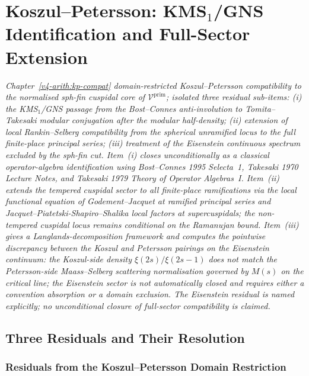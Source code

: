 \chapter{Koszul--Petersson: KMS\texorpdfstring{\({}_{1}\)}{1}/GNS Identification and Full-Sector Extension}
\label{v4-arith:kms-gns-full}

\emph{Chapter~\ref{v4-arith:kp-compat} domain-restricted
Koszul--Petersson compatibility to the normalised sph-fin cuspidal
core of \(\mathcal{V}^{\mathrm{prim}}\);
 isolated three residual
sub-items: (i) the KMS\({}_{1}\)/GNS passage from the Bost--Connes
anti-involution to Tomita--Takesaki modular conjugation after the
modular half-density; (ii)
extension of local Rankin--Selberg compatibility from the spherical
unramified locus to the full finite-place principal series; (iii)
treatment of the Eisenstein continuous spectrum excluded by the
sph-fin cut. Item~(i) closes unconditionally as a classical
operator-algebra identification using Bost--Connes 1995 Selecta~1,
Takesaki 1970 Lecture Notes, and Takesaki 1979 \emph{Theory of
Operator Algebras~I}. Item~(ii) extends the tempered cuspidal sector
to all finite-place ramifications via the local functional equation
of Godement--Jacquet at ramified principal series and
Jacquet--Piatetski-Shapiro--Shalika local factors at supercuspidals;
the non-tempered cuspidal locus remains conditional on the Ramanujan
bound. Item~(iii) gives a Langlands-decomposition framework and
computes the pointwise discrepancy between the Koszul and Petersson
pairings on the Eisenstein continuum: the Koszul-side density
\(\xi(2s)/\xi(2s-1)\) does \emph{not} match the Petersson-side
Maass--Selberg scattering normalisation governed by \(M(s)\) on the
critical line; the Eisenstein sector is not automatically closed and
requires either a convention absorption or a domain exclusion. The Eisenstein residual is
named explicitly; no unconditional closure of full-sector compatibility
is claimed.}

\section{Three Residuals and Their Resolution}
\label{v4-arith:kms-gns:statement-table}

\subsection{Residuals from the Koszul--Petersson Domain Restriction}
\label{v4-arith:kms-gns:residuals}

